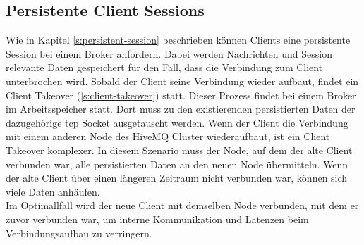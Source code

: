 \subsection{Persistente Client Sessions} \label{sp:persistent-session}
Wie in Kapitel \ref{s:persistent-session} beschrieben können Clients eine persistente Session bei einem Broker anfordern. Dabei werden Nachrichten und Session relevante Daten gespeichert für den Fall, dass die Verbindung zum Client unterbrochen wird. Sobald der Client seine Verbindung wieder aufbaut, findet ein Client Takeover (\ref{s:client-takeover}) statt.
Dieser Prozess findet bei einem Broker im Arbeitsspeicher statt.
Dort muss zu den existierenden persistierten Daten der dazugehörige \ac{tcp} Socket ausgetauscht werden.
Wenn der Client die Verbindung mit einem anderen Node des HiveMQ Cluster wiederaufbaut, ist ein Client Takeover komplexer.
In diesem Szenario muss der Node, auf dem der alte Client verbunden war, alle persistierten Daten an den neuen Node übermitteln.
Wenn der alte Client über einen längeren Zeitraum nicht verbunden war, können sich viele Daten anhäufen.
\\
Im Optimallfall wird der neue Client mit demselben Node verbunden, mit dem er zuvor verbunden war, um interne Kommunikation und Latenzen beim Verbindungsaufbau zu verringern.
\begin{comment}
Um einen Client immer zum selben Node zu verbinden werden bei anderen Protokollen wie \ac{http} zum Beispiel Cookies verwendet. Die Cookies werden von dem Load Balancer ausgelesen und enthalten Informationen zu welchem Node der Client als letztes verbunden war. Das \ac{mqtt} Protokoll unterstützt keinen Mechanismus, der wie \ac{http} Cookies funktioniert.
Eine weitere Option einen Client immer zum selben Node zu verbinden ist consistent hashing, wie in Kapitel \ref{sb:lb-algo} beschrieben. Dabei werden Layer vier Informationen des Clients ausgelesen, wie zum Beispiel die \ac{ip} Adresse, und gehasht. Anhand des Hashes wird anschlie{\ss}end der Node bestimmt, zu welchem der Client verbunden wird. Solange sich keine der gehashten Informationen ändert, wird der Client immer an den selben Node weitergeleitet.
Je nach Anwendungsfall verbinden sich \ac{mqtt} Clients auch über das Mobilfunknetz. Durch den ständigen Standortwechsel wird zwangsweise ebenfalls der Mobilfunkmast gewechselt. Es wird nicht garantiert, dass der LKW immer die selbe \ac{ip} behält. \verb|MAGLEV| würde somit bei einem Verbindungsabbruch den Client an einen neuen Node weiterleiten.
\end{comment}

